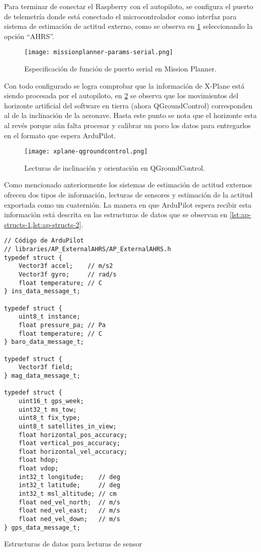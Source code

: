 Para terminar de conectar el Raspberry con el autopiloto, se configura el puerto de telemetría donde está conectado el microcontrolador como interfaz para sistema de estimación de actitud externo, como se observa en \cref{fig:missionplanner-params-serial} seleccionando la opción ``AHRS''.

\begin{figure}[h]
    \centering
    \texttt{[image: missionplanner-params-serial.png]}
    \caption{Especificación de función de puerto serial en Mission Planner.}
    \label{fig:missionplanner-params-serial}
\end{figure}

Con todo configurado se logra comprobar que la información de X-Plane está siendo procesada por el autopiloto, en \cref{fig:qgroundcontrol2} se observa que los movimientos del horizonte artificial del software en tierra (ahora QGroundControl) corresponden al de la inclinación de la aeronave. Hasta este punto se nota que el horizonte esta al revés porque aún falta procesar y calibrar un poco los datos para entregarlos en el formato que espera ArduPilot.

\begin{figure}[h]
    \centering
    \texttt{[image: xplane-qgroundcontrol.png]}
    \caption{Lecturas de inclinación y orientación en QGroundControl.}
    \label{fig:qgroundcontrol2}
\end{figure}

Como mencionado anteriormente los sistemas de estimación de actitud externos ofrecen dos tipos de información, lecturas de sensores y estimación de la actitud exportada como un cuaternión. La manera en que ArduPilot espera recibir esta información está descrita en las estructuras de datos que se observan en \cref{lst:ap-structs-1,lst:ap-structs-2}.

\begin{listing}[h]
    \begin{verbatim}
// Código de ArduPilot
// libraries/AP_ExternalAHRS/AP_ExternalAHRS.h
typedef struct {
    Vector3f accel;    // m/s2
    Vector3f gyro;     // rad/s 
    float temperature; // C
} ins_data_message_t;

typedef struct {
    uint8_t instance;
    float pressure_pa; // Pa
    float temperature; // C
} baro_data_message_t;

typedef struct {
    Vector3f field;
} mag_data_message_t;

typedef struct {
    uint16_t gps_week;
    uint32_t ms_tow;
    uint8_t fix_type;
    uint8_t satellites_in_view;
    float horizontal_pos_accuracy;
    float vertical_pos_accuracy;
    float horizontal_vel_accuracy;
    float hdop;
    float vdop;
    int32_t longitude;    // deg
    int32_t latitude;     // deg
    int32_t msl_altitude; // cm
    float ned_vel_north;  // m/s
    float ned_vel_east;   // m/s
    float ned_vel_down;   // m/s
} gps_data_message_t;
    \end{verbatim}
    \caption{Estructuras de datos para lecturas de sensor}
    \label{lst:ap-structs-1}
\end{listing}


